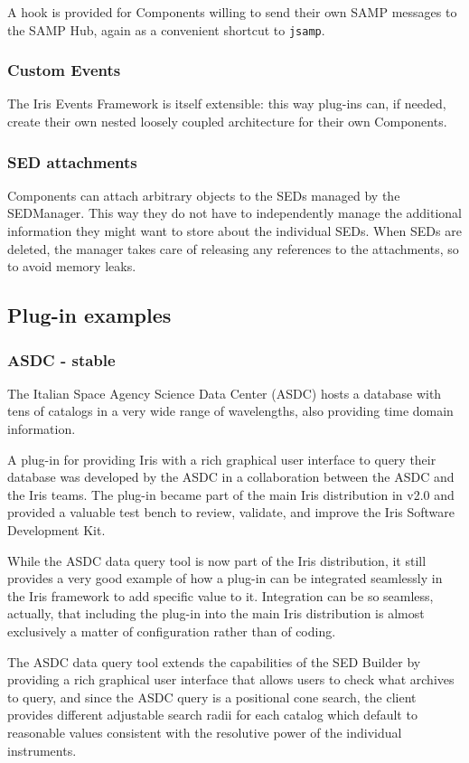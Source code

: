 \documentclass[5p]{elsarticle}
\begin{document}
A hook is provided for Components willing to send their own SAMP messages to the SAMP Hub, again as a convenient shortcut to \verb|jsamp|.

\subsubsection{Custom Events}
The Iris Events Framework is itself extensible: this way plug-ins can, if needed, create their own nested loosely coupled architecture for their own Components.

\subsubsection{SED attachments}
Components can attach arbitrary objects to the SEDs managed by the SEDManager. This way they do not have to independently manage the additional information they might want to store about the individual SEDs. When SEDs are deleted, the manager takes care of releasing any references to the attachments, so to avoid memory leaks.



\subsection{Plug-in examples}
\subsubsection{ASDC - stable}
The Italian Space Agency Science Data Center (ASDC) hosts a database with tens of catalogs in a very wide range of wavelengths, also providing time domain information.

A plug-in for providing Iris with a rich graphical user interface to query their database was developed by the ASDC in a collaboration between the ASDC and the Iris teams. The plug-in became part of the main Iris distribution in v2.0 and provided a valuable test bench to review, validate, and improve the Iris Software Development Kit.

While the ASDC data query tool is now part of the Iris distribution, it still provides a very good example of how a plug-in can be integrated seamlessly in the Iris framework to add specific value to it. Integration can be so seamless, actually, that including the plug-in into the main Iris distribution is almost exclusively a matter of configuration rather than of coding.

The ASDC data query tool extends the capabilities of the SED Builder by providing a rich graphical user interface that allows users to check what archives to query, and since the ASDC query is a positional cone search, the client provides different adjustable search radii for each catalog which default to reasonable values consistent with the resolutive power of the individual instruments.
\end{document}

